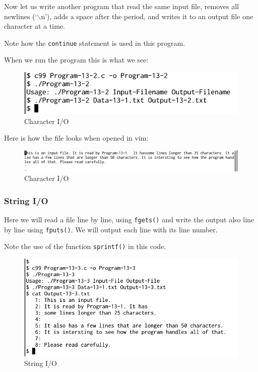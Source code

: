\documentclass[11pt,a4paper]{article}
\begin{document}
Now let us write another program that read the same input file, removes all newlines (`$\backslash$n'), adds a space after the period, and writes it to an output file one character at a time.



Note how the \lstinline!continue! statement is used in this program.

When we run the program this is what we see:
\begin{figure}[ht]
\begin{center}
\includegraphics[scale=0.6]{Output-13-2.png}
\caption{Character I/O}
\label{output-13-2}
\end{center}
\end{figure}

Here is how the file looks when opened in vim:
\begin{figure}[ht]

\begin{center}
\includegraphics[scale=0.4]{Output-Edit-13-2.png}
\caption{Character I/O}
\label{output-edit-13-2}
\end{center}
\end{figure}
 
\subsubsection*{String I/O}
Here we will read a file line by line, using \texttt{fgets()} and write the output also line by line using \texttt{fputs()}. We will output each line with its line number.

Note the use of the function \texttt{sprintf()} in this code.



\begin{figure}[ht]
\begin{center}
\includegraphics[scale=0.4]{Output-13-3.png}
\caption{String I/O}
\label{output-13-3}
\end{center}
\end{figure}
\end{document}
